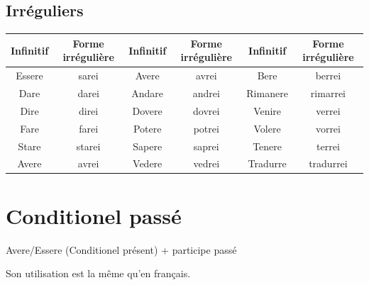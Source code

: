 \documentclass[12pt, openany]{report}
\begin{document}
\subsection{Irréguliers}
\begin{center}
    \begin{tabular}{c|c||c|c||c|c}
        Infinitif & Forme irrégulière & Infinitif & Forme irrégulière & Infinitif & Forme irrégulière\\ \hline 
        Essere & sarei & Avere & avrei & Bere & berrei\\
        Dare & darei & Andare & andrei & Rimanere & rimarrei\\
        Dire & direi & Dovere & dovrei & Venire & verrei\\
        Fare & farei & Potere & potrei & Volere & vorrei\\
        Stare & starei & Sapere & saprei & Tenere & terrei\\
        Avere & avrei & Vedere & vedrei & Tradurre & tradurrei\\
    \end{tabular}
\end{center}
\section{Conditionel passé}
\begin{center}
    Avere/Essere (Conditionel présent) + participe passé
\end{center}
Son utilisation est la même qu'en français. 
\end{document}
